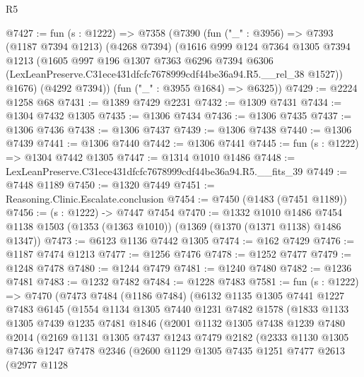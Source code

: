\begin{lexlean}{R5}
\begin{coremodule}
@7427 := fun (s : @1222) =>
  @7358
    (@7390
      (fun ("_" : @3956) =>
      @7393
        (@1187 @7394 @1213)
        (@4268 @7394)
        (@1616
          @999
          @124
          @7364
          @1305
          @7394
          @1213
          (@1605
            @997
            @196
            @1307
            @7363
            @6296
            @7394
            @6306
            (LexLeanPreserve.C31ece431dfcfc7678999cdf44be36a94.R5.__rel_38 @1527))
          @1676)
        (@4292 @7394))
      (fun ("_" : @3955 @1684) => @6325))
@7429 := @2224 @1258 @68
@7431 := @1389 @7429 @2231
@7432 := @1309 @7431
@7434 := @1304 @7432 @1305
@7435 := @1306 @7434
@7436 := @1306 @7435
@7437 := @1306 @7436
@7438 := @1306 @7437
@7439 := @1306 @7438
@7440 := @1306 @7439
@7441 := @1306 @7440
@7442 := @1306 @7441
@7445 := fun (s : @1222) => @1304 @7442 @1305
@7447 := @1314 @1010 @1486
@7448 := LexLeanPreserve.C31ece431dfcfc7678999cdf44be36a94.R5.__fits_39
@7449 := @7448 @1189
@7450 := @1320 @7449
@7451 := Reasoning.Clinic.Escalate.conclusion
@7454 := @7450 (@1483 (@7451 @1189))
@7456 := (s : @1222) -> @7447 @7454
@7470 := @1332
    @1010
    @1486
    @7454
    @1138
    @1503
    (@1353 (@1363 @1010))
    (@1369 (@1370 (@1371 @1138) @1486 @1347))
@7473 := @6123 @1136 @7442 @1305
@7474 := @162 @7429
@7476 := @1187 @7474 @1213
@7477 := @1256 @7476
@7478 := @1252 @7477
@7479 := @1248 @7478
@7480 := @1244 @7479
@7481 := @1240 @7480
@7482 := @1236 @7481
@7483 := @1232 @7482
@7484 := @1228 @7483
@7581 := fun (s : @1222) =>
  @7470
    (@7473
      @7484
      (@1186 @7484)
      (@6132
        @1135
        @1305
        @7441
        @1227
        @7483
        @6145
        (@1554
          @1134
          @1305
          @7440
          @1231
          @7482
          @1578
          (@1833
            @1133
            @1305
            @7439
            @1235
            @7481
            @1846
            (@2001
              @1132
              @1305
              @7438
              @1239
              @7480
              @2014
              (@2169
                @1131
                @1305
                @7437
                @1243
                @7479
                @2182
                (@2333
                  @1130
                  @1305
                  @7436
                  @1247
                  @7478
                  @2346
                  (@2600
                    @1129
                    @1305
                    @7435
                    @1251
                    @7477
                    @2613
                    (@2977
                      @1128

\end{coremodule}
\end{lexlean}

